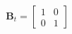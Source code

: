 \documentclass[preview]{standalone}
\begin{document}
\begin{align*}
\mathbf{B}_t = \begin{bmatrix} 1 & 0 \\0 & 1\end{bmatrix}
\end{align*}
\end{document}
